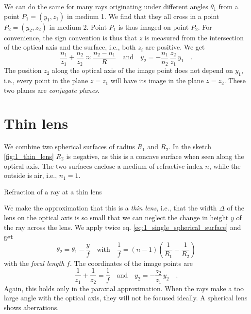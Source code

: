 We can do the same for many rays originating under different angles $\theta_1$ from  a point $P_1 =(y_1, z_1)$ in medium 1. We find that they all cross in a point $P_2 = (y_2, z_2)$ in medium 2. Point $P_1$ is thus imaged on point $P_2$. For convenience, the sign convention is thus that $z$ is measured from the intersection of the optical axis and the surface, i.e., both $z_i$ are positive.
We get
\begin{equation}
    \frac{n_1}{z_1} + \frac{n_2}{z_2} \approx \frac{n_2 - n_1}{R} \quad \text{and} \quad
    y_2 = - \frac{n_1}{n_2} \, \frac{z_2}{z_1} \, y_1 \quad .
\end{equation}
The position $z_2$ along the optical axis of the image point does not depend on $y_1$, i.e., every point in the plane $z=z_1$ will have its image in the plane $z = z_2$. These two planes are \emph{conjugate planes}.




\section{Thin lens}

We combine two spherical surfaces of radius $R_1$ and $R_2$. In the sketch \ref{fig:1_thin_lens} $R_2$ is negative, as this is a concave surface when seen along the optical axis. The two surfaces enclose a medium of refractive index $n$, while the outside is air, i.e., $n_1 = 1$.

\begin{marginfigure}

   \caption{Refraction of  a ray at a thin lens}
   \label{fig:1_thin_lens}
\end{marginfigure}


We make the approximation that this is a \emph{thin lens}, i.e., that the width $\Delta$ of the lens on the optical axis is so small that we can neglect the change in height $y$ of the ray across the lens. We apply twice eq. \ref{eq:1_single_spherical_surface} and get
\begin{equation}
    \theta_2 = \theta_1 - \frac{y}{f} \quad \text{with} \quad
   \frac{1}{f} = (n-1) \left( \frac{1}{R_1} - \frac{1}{R_2} \right) 
\end{equation}
with the \emph{focal length} $f$. The coordinates of the image points are
\begin{equation}
    \frac{1}{z_1} + \frac{1}{z_2} = \frac{1}{f} \quad \text{and} \quad 
    y_2 = - \frac{z_2}{z_1} \, y_2 \quad .
\end{equation}
Again, this holds only in the paraxial approximation. When the rays make a too large angle with the optical axis, they will not be focused ideally. A spherical lens shows aberrations.

